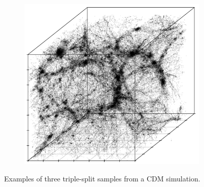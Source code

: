\documentclass[12pt]{article}
\begin{document}
\begin{figure}[htp!]
\begin{subfigure}{0.25\textwidth}
    \label{fig:cubeDiagsB}
  \end{subfigure}
    \begin{subfigure}{0.25\textwidth}
    \centering
        \caption{}
  \includegraphics[width=\linewidth]{triplesplitC.pdf}
    \label{fig:cubeDiagsC}
  \end{subfigure}
    \caption{Examples of three triple-split samples from a CDM simulation.}
    \label{fig:cubeDiags}
\end{figure}

\end{document}
